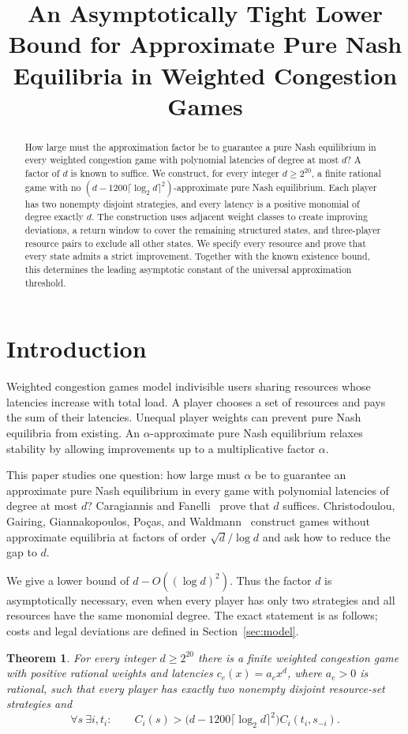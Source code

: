 \documentclass[11pt]{article}
\title{An Asymptotically Tight Lower Bound for Approximate Pure Nash Equilibria in Weighted Congestion Games}
\author{}
\date{}
\newtheorem{theorem}{Theorem}[section]
\theoremstyle{definition}
\begin{document}
\maketitle
\begin{abstract}
How large must the approximation factor be to guarantee a pure Nash equilibrium in every weighted congestion game with polynomial latencies of degree at most $d$? A factor of $d$ is known to suffice. We construct, for every integer $d\ge2^{20}$, a finite rational game with no $(d-1200\lceil\log_2d\rceil^2)$-approximate pure Nash equilibrium. Each player has two nonempty disjoint strategies, and every latency is a positive monomial of degree exactly $d$. The construction uses adjacent weight classes to create improving deviations, a return window to cover the remaining structured states, and three-player resource pairs to exclude all other states. We specify every resource and prove that every state admits a strict improvement. Together with the known existence bound, this determines the leading asymptotic constant of the universal approximation threshold.
\end{abstract}

\section{Introduction}
Weighted congestion games model indivisible users sharing resources whose latencies increase with total load. A player chooses a set of resources and pays the sum of their latencies. Unequal player weights can prevent pure Nash equilibria from existing. An $\alpha$-approximate pure Nash equilibrium relaxes stability by allowing improvements up to a multiplicative factor $\alpha$.

This paper studies one question: how large must $\alpha$ be to guarantee an approximate pure Nash equilibrium in every game with polynomial latencies of degree at most $d$? Caragiannis and Fanelli~\cite{CF2021} prove that $d$ suffices. Christodoulou, Gairing, Giannakopoulos, Po\c{c}as, and Waldmann~\cite{CGGPW2023} construct games without approximate equilibria at factors of order $\sqrt d/\log d$ and ask how to reduce the gap to $d$.

We give a lower bound of $d-O((\log d)^2)$. Thus the factor $d$ is asymptotically necessary, even when every player has only two strategies and all resources have the same monomial degree. The exact statement is as follows; costs and legal deviations are defined in Section~\ref{sec:model}.
\begin{theorem}\label{thm:near}
For every integer $d\ge2^{20}$ there is a finite weighted congestion game with positive rational weights and latencies $c_e(x)=a_ex^d$, where $a_e>0$ is rational, such that every player has exactly two nonempty disjoint resource-set strategies and
\begin{equation}\label{eq:nearlower}
 \forall s\ \exists i,t_i:\qquad
 C_i(s)>\bigl(d-1200\lceil\log_2d\rceil^2\bigr)C_i(t_i,s_{-i}).
\end{equation}
\end{theorem}
\end{document}
